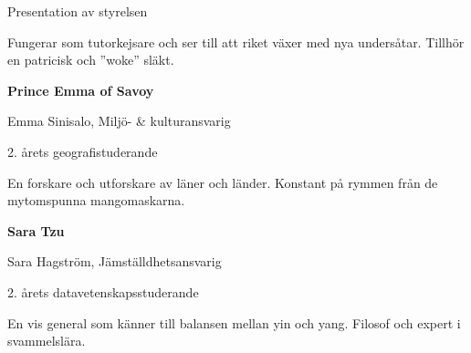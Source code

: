 \documentclass{spektraklet}
\begin{document}
\begin{artikel}{Presentation av styrelsen}{}
\begin{twocolumns}
Fungerar som tutorkejsare och ser till att riket växer med nya undersåtar. Tillhör en patricisk och ''woke'' släkt.


\textbf{Prince Emma of Savoy}

Emma Sinisalo, Miljö- \& kulturansvarig

2. årets geografistuderande

En forskare och utforskare av läner och länder. Konstant på rymmen från de mytomspunna mangomaskarna.


\textbf{Sara Tzu}

Sara Hagström, Jämställdhetsansvarig

2. årets datavetenskapsstuderande

En vis general som känner till balansen mellan yin och yang. Filosof och expert i svammelslära.

\end{twocolumns}
\end{artikel}
\end{document}
